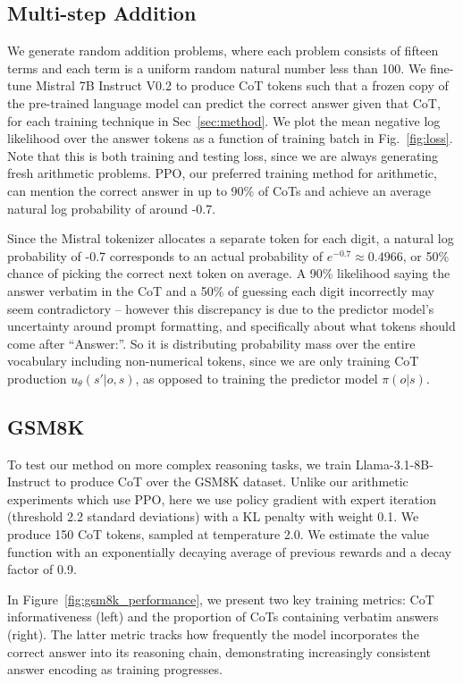 \documentclass{article}
\theoremstyle{plain}
\theoremstyle{definition}
\theoremstyle{remark}
\begin{document}
\subsection{Multi-step Addition}
\label{subsec:solving}
We generate random addition problems, where each problem consists of fifteen terms and each term is a uniform random natural number less than 100. We fine-tune Mistral 7B Instruct V0.2 to produce CoT tokens such that a frozen copy of the pre-trained language model can predict the correct answer given that CoT, for each training technique in Sec~\ref{sec:method}. We plot the mean negative log likelihood over the answer tokens as a function of training batch in Fig.~\ref{fig:loss}. Note that this is both training and testing loss, since we are always generating fresh arithmetic problems. PPO, our preferred training method for arithmetic, can mention the correct answer in up to 90\% of CoTs and achieve an average natural log probability of around -0.7. 

Since the Mistral tokenizer allocates a separate token for each digit, a natural log probability of -0.7 corresponds to an actual probability of $e^{-0.7} \approx 0.4966$, or 50\% chance of picking the correct next token on average. A 90\% likelihood saying the answer verbatim in the CoT and a 50\% of guessing each digit incorrectly may seem contradictory -- however this discrepancy is due to the predictor model's uncertainty around prompt formatting, and specifically about what tokens should come after ``Answer:''. So it is distributing probability mass over the entire vocabulary including non-numerical tokens, since we are only training CoT production $u_\theta(s'|o,s)$, as opposed to training the predictor model $\pi(o|s)$.

\subsection{GSM8K}
\label{subsec:gsm8k}
To test our method on more complex reasoning tasks, we train Llama-3.1-8B-Instruct to produce CoT over the GSM8K dataset. Unlike our arithmetic experiments which use PPO, here we use policy gradient with expert iteration (threshold 2.2 standard deviations) with a KL penalty with weight 0.1. We produce 150 CoT tokens, sampled at temperature 2.0. We estimate the value function with an exponentially decaying average of previous rewards and a decay factor of 0.9. 

In Figure~\ref{fig:gsm8k_performance}, we present two key training metrics: CoT informativeness (left) and the proportion of CoTs containing verbatim answers (right). The latter metric tracks how frequently the model incorporates the correct answer into its reasoning chain, demonstrating increasingly consistent answer encoding as training progresses.
\end{document}
